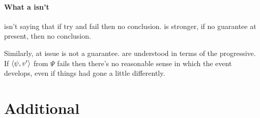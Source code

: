 \paragraph{What a \requ{} isn't}

\begin{note}
  \requ{} isn't saying that if try and fail then no conclusion.
  \requ{} is stronger, if no guarantee at present, then no conclusion.
\end{note}

\begin{note}
  Similarly, at issue is not a guarantee.
   are understood in terms of the progressive.
  If \(\langle \psi, v' \rangle\) from \(\Psi\) fails then there's no reasonable sense in which the event develops, even if things had gone a little differently.
\end{note}

\section{Additional }
\label{cha:requs:sec:expanding}

